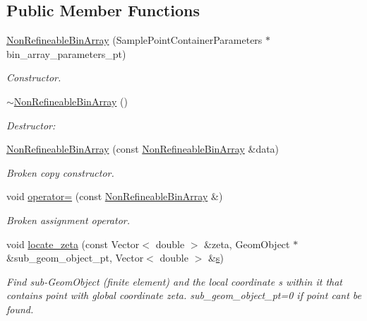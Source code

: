 \subsection*{Public Member Functions}
\begin{DoxyCompactItemize}
\item 
\hyperlink{classNonRefineableBinArray_addc6a573733705d5178d1773a9a4a879}{Non\+Refineable\+Bin\+Array} (Sample\+Point\+Container\+Parameters $\ast$bin\+\_\+array\+\_\+parameters\+\_\+pt)
\begin{DoxyCompactList}\small\item\em Constructor. \end{DoxyCompactList}\item 
\hyperlink{classNonRefineableBinArray_afff18c4b70bf9b44d6b682e1d9d2ab84}{$\sim$\+Non\+Refineable\+Bin\+Array} ()
\begin{DoxyCompactList}\small\item\em Destructor\+: \end{DoxyCompactList}\item 
\hyperlink{classNonRefineableBinArray_aec847df01ee998dd1cf19a38e2b99b5f}{Non\+Refineable\+Bin\+Array} (const \hyperlink{classNonRefineableBinArray}{Non\+Refineable\+Bin\+Array} \&data)
\begin{DoxyCompactList}\small\item\em Broken copy constructor. \end{DoxyCompactList}\item 
void \hyperlink{classNonRefineableBinArray_abd5b04d28370d977a6c32fefb9d2e6f1}{operator=} (const \hyperlink{classNonRefineableBinArray}{Non\+Refineable\+Bin\+Array} \&)
\begin{DoxyCompactList}\small\item\em Broken assignment operator. \end{DoxyCompactList}\item 
void \hyperlink{classNonRefineableBinArray_a27abcdeac898d37af63968ed97427e36}{locate\+\_\+zeta} (const Vector$<$ double $>$ \&zeta, Geom\+Object $\ast$\&sub\+\_\+geom\+\_\+object\+\_\+pt, Vector$<$ double $>$ \&\hyperlink{cfortran_8h_ab7123126e4885ef647dd9c6e3807a21c}{s})
\begin{DoxyCompactList}\small\item\em Find sub-\/\+Geom\+Object (finite element) and the local coordinate s within it that contains point with global coordinate zeta. sub\+\_\+geom\+\_\+object\+\_\+pt=0 if point can\textquotesingle{}t be found. \end{DoxyCompactList}\item 

\end{DoxyCompactItemize}
